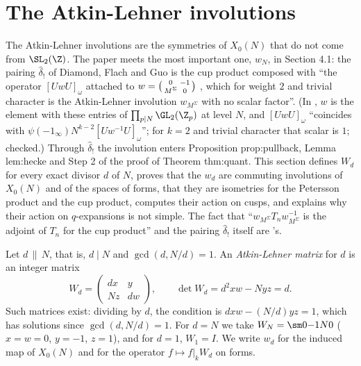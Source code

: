 \section{The Atkin-Lehner involutions}\label{sec:modforms:atkin-lehner}

The Atkin-Lehner involutions are the symmetries of $X_0(N)$ that do not come from $\SL_2(\Z)$. The paper meets the most important one, $w_N$, in Section 4.1: the pairing $\hat\delta_!$
of Diamond, Flach and Guo is the cup product composed with ``the operator $[UwU]_\omega$ attached to $w=\begin{psmallmatrix}0&-1\\M^\Sigma&0\end{psmallmatrix}$ \cite[\S1.5.3, (13), (14)]{DFG04},
which for weight $2$ and trivial character is the Atkin-Lehner involution $w_{M^\Sigma}$ with no scalar factor''. (In \cite[Section 1.5.3]{DFG04}, $w$ is the element with these entries of $\prod_{p\mid N}\GL_2(\Z_p)$
at level $N$, and $[UwU]_\omega$ ``coincides with $\psi(-1_\infty)N^{k-2}[Uw^{-1}U]_\omega$''; for $k=2$ and trivial character that scalar is $1$; checked.) Through $\hat\delta_!$ the involution enters Proposition prop:pullback,
Lemma lem:hecke and Step 2 of the proof of Theorem thm:quant. This section defines $W_d$ for every exact divisor $d$ of $N$, proves that the $w_d$ are commuting involutions of
$X_0(N)$ and of the spaces of forms, that they are isometries for the Petersson product and the cup product, computes their action on cusps, and explains why their action
on $q$-expansions is not simple. The fact that ``$w_{M^\Sigma}T_nw_{M^\Sigma}^{-1}$ is the adjoint of $T_n$ for the cup product'' and the pairing $\hat\delta_!$ itself are 's.

\begin{definition}\label{def:modforms:atkin-lehner}
Let $d\,\|\,N$, that is, $d\mid N$ and $\gcd(d,N/d)=1$. An \emph{Atkin-Lehner matrix} for $d$ is an integer matrix
\[
W_d=\begin{pmatrix}dx&y\\Nz&dw\end{pmatrix},\qquad\det W_d=d^2xw-Nyz=d .
\]
Such matrices exist: dividing by $d$, the condition is $dxw-(N/d)yz=1$, which has solutions since $\gcd(d,N/d)=1$. For $d=N$ we take $W_N=\sm0{-1}N0$ ($x=w=0$, $y=-1$, $z=1$), and for
$d=1$, $W_1=I$. We write $w_d$ for the induced map of $X_0(N)$ and for the operator $f\mapsto f|_kW_d$ on forms.
\end{definition}

